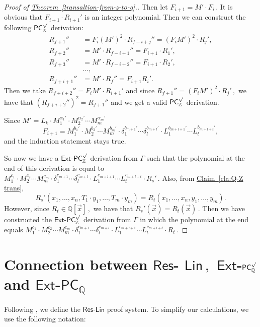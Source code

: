 \documentclass[11pt]{article}
\newcommand{\expref}[2]{\texorpdfstring{\hyperref[#2]{#1~\ref{#2}}}{#1~\ref{#2}}}
\newcommand{\Q}{{\mathbb Q}}
\newcommand{\Z}{{\mathbb Z}}
\begin{document}
\begin{proof}[Proof of \expref{Theorem}{transaltion-from-z-to-q}.]
%
Then let %
$F_{i + 1} = M' \cdot F_i\,.$ %
 It is obvious that $F_{i + 1} \cdot R_{i + 1}'$ is an integer polynomial. Then we can construct the following $\mathsf{PC}_{\Z}^{\surd}$ derivation: %
\begin{align*}
    R_{f + 1}'' &= F_i (M')^2 \cdot R_{f - i + j}'' =  (F_i M')^2 \cdot R_j', \\  R_{f + 2}'' &= M' \cdot R_{f - i + 1}'' = F_{i + 1} \cdot R_1', \\  R_{f + 3}'' &= M' \cdot R_{f - i + 2}'' = F_{i + 1} \cdot R_2', \\ &\ldots, \\ R_{f + i + 1}'' &= M' \cdot R_{f}'' = F_{i + 1} R_{i}'.
\end{align*}
Then we take $R_{f + i + 2}'' = F_i M' \cdot R_{i + 1}'$ and since %
$R_{f + 1}'' = (F_i M')^2 \cdot R_j'\,,$ %
 we have that $(R_{f + i + 2}'')^2 = R_{f + 1}''$ and we get a valid $\mathsf{PC}_{\Z}^{\surd}$ derivation.

%
Since  $M' = L_k \cdot M_1^{\alpha_1'} \cdot M_2^{\alpha_2'} \cdots M_m^{\alpha_m'}$ %
$$
%
F_{i + 1} = M_1^{b_1'} \cdot M_2^{b_2'} \cdots M_m^{b_m'} \cdot \delta_1^{b_{m + 1}'} \cdots \delta_l^{b_{m + l}'} \cdot  L_1^{b_{m + l + 1}'} \cdots L_t^{b_{m + l + t}'}, %
$$
and the induction statement stays true.




So now we have a $\mathsf{Ext}$-$\mathsf{PC}^{\surd}_{\Z}$ derivation from $\Gamma$ such that the polynomial at %
the end of this derivation is equal to %
$M_1^{c_1} \cdot M_2^{c_2} \cdots M_m^{c_m} \cdot \delta_1^{c_{m + 1}} \cdots \delta_l^{c_{m + l}} \cdot  L_1^{c_{m + l + 1}} \cdots L_t^{c_{m + l + t}}  \cdot R_s'\,.$ %
 Also, from  \expref{Claim}{cla:Q-Z trans},
$$
    R_s'(x_1, \ldots, x_n, T_1 \cdot y_1, \ldots, T_m \cdot y_m) = R_t(x_1, \ldots, x_n, y_1, \ldots, y_m).
$$
    However, since %
$R_t \in \Q[\vec x]\,,$ %
 we have that %
$R_s'(\vec x) = R_t(\vec x)\,.$ %
 Then we have constructed the $\mathsf{Ext}$-$\mathsf{PC}^{\surd}_{\Z}$ derivation from $\Gamma$ in which the polynomial at %
%
the end equals  %
$M_1^{c_1} \cdot M_2^{c_2} \cdots M_m^{c_m} \cdot \delta_1^{c_{m + 1}} \cdots \delta_l^{c_{m + l}} \cdot  L_1^{c_{m + l + 1}} \cdots L_t^{c_{m + l + t}}  \cdot R_t\,.$ %
%
\end{proof}

\section{Connection between \texorpdfstring{$\mathsf{Res}$-%
$\mathsf{Lin}\,,$ %
 $\mathsf{Ext}$-$\mathsf{PC}_{\Q}^{\surd}$ and $\mathsf{Ext}$-$\mathsf{PC}_{\Q}$}{Res-Lin, Ext-PC-Q-sqrt and Ext-PC-Q}}
\label{section-4}
Following \cite{RT07}, we define the $\mathsf{Res}$-$\mathsf{Lin}$ proof system. To simplify our calculations, we use the following notation:
\end{document}
